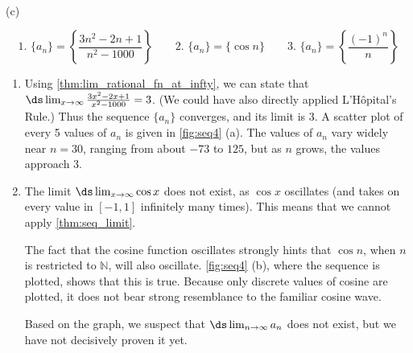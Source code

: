 \begin{example}
{
\\(c)}
%
\[
 \text{1. }\{a_n\} = \left\{\frac{3n^2-2n+1}{n^2-1000}\right\}\qquad
 \text{2. }\{a_n\} = \{\cos n \}\qquad
 \text{3. }\{a_n\} = \left\{\frac{(-1)^n}{n}\right\}
\]
\solution
\begin{enumerate}
\item		Using \autoref{thm:lim_rational_fn_at_infty}, we can state that $\ds\lim_{x\to\infty} \frac{3x^2-2x+1}{x^2-1000} = 3$. (We could have also directly applied L'Hôpital's Rule.) Thus the sequence $\{a_n\}$ converges, and its limit is 3. A scatter plot of every 5 values of $a_n$ is given in \autoref{fig:seq4} (a). The values of $a_n$ vary widely near $n=30$, ranging from about $-73$ to $125$, but as $n$ grows, the values approach 3.

\item		The limit $\ds\lim_{x\to\infty}\cos x$ does not exist, as $\cos x$ oscillates (and takes on every value in $[-1,1]$ infinitely many times). This means that we cannot apply \autoref{thm:seq_limit}. 

The fact that the cosine function oscillates strongly hints that $\cos n$, when $n$ is restricted to $\mathbb{N}$, will also oscillate. \autoref{fig:seq4} (b), where the sequence is plotted, shows that this is true. Because only discrete values of cosine are plotted, it does not bear strong resemblance to the familiar cosine wave.

Based on the graph, we suspect that $\ds \lim_{n\to\infty} a_n$ does not exist, but we have not decisively proven it yet.



\end{enumerate}
\end{example}
